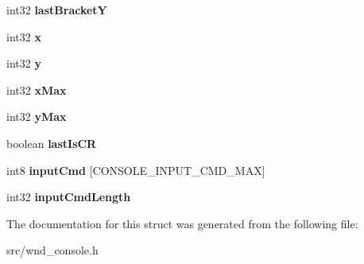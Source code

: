 \begin{DoxyCompactItemize}
\item 
\hypertarget{struct_w_n_d___c_o_n_s_o_l_e_a7e8274af7cd3015434f9bb6a26238da0}{}int32 {\bfseries last\+Bracket\+Y}\label{struct_w_n_d___c_o_n_s_o_l_e_a7e8274af7cd3015434f9bb6a26238da0}

\item 
\hypertarget{struct_w_n_d___c_o_n_s_o_l_e_a86430a507534c2d50bf26ab958350013}{}int32 {\bfseries x}\label{struct_w_n_d___c_o_n_s_o_l_e_a86430a507534c2d50bf26ab958350013}

\item 
\hypertarget{struct_w_n_d___c_o_n_s_o_l_e_aeb3152782d34650853d0a1d58d4ca22b}{}int32 {\bfseries y}\label{struct_w_n_d___c_o_n_s_o_l_e_aeb3152782d34650853d0a1d58d4ca22b}

\item 
\hypertarget{struct_w_n_d___c_o_n_s_o_l_e_af7eaf96a2ad565a754905ebc2e864fdd}{}int32 {\bfseries x\+Max}\label{struct_w_n_d___c_o_n_s_o_l_e_af7eaf96a2ad565a754905ebc2e864fdd}

\item 
\hypertarget{struct_w_n_d___c_o_n_s_o_l_e_af66ef0630f7b5423b9dcf9983df441ad}{}int32 {\bfseries y\+Max}\label{struct_w_n_d___c_o_n_s_o_l_e_af66ef0630f7b5423b9dcf9983df441ad}

\item 
\hypertarget{struct_w_n_d___c_o_n_s_o_l_e_a1ab6bbcd5f327fcf31c092765d9107c6}{}boolean {\bfseries last\+Is\+C\+R}\label{struct_w_n_d___c_o_n_s_o_l_e_a1ab6bbcd5f327fcf31c092765d9107c6}

\item 
\hypertarget{struct_w_n_d___c_o_n_s_o_l_e_a01931795ca529f11272cdeb43ba6bf57}{}int8 {\bfseries input\+Cmd} \mbox{[}C\+O\+N\+S\+O\+L\+E\+\_\+\+I\+N\+P\+U\+T\+\_\+\+C\+M\+D\+\_\+\+M\+A\+X\mbox{]}\label{struct_w_n_d___c_o_n_s_o_l_e_a01931795ca529f11272cdeb43ba6bf57}

\item 
\hypertarget{struct_w_n_d___c_o_n_s_o_l_e_a006836d03570b789b2bb304b2083393c}{}int32 {\bfseries input\+Cmd\+Length}\label{struct_w_n_d___c_o_n_s_o_l_e_a006836d03570b789b2bb304b2083393c}

\end{DoxyCompactItemize}


The documentation for this struct was generated from the following file\+:\begin{DoxyCompactItemize}
\item 
src/wnd\+\_\+console.\+h\end{DoxyCompactItemize}
